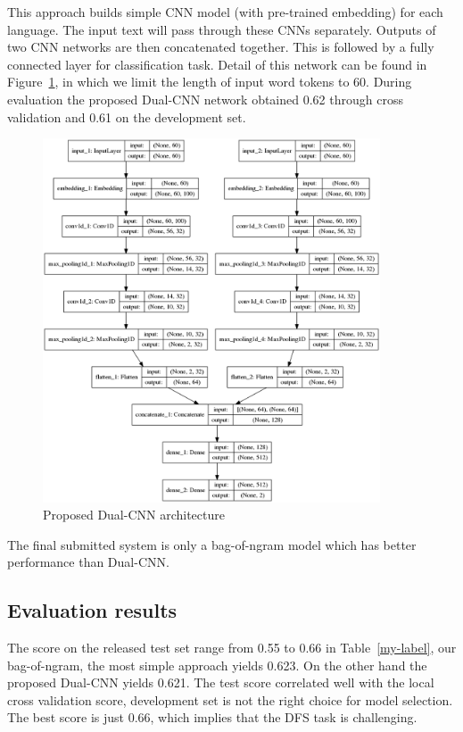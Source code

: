 \documentclass[11pt]{article}
\begin{document}
This approach builds simple CNN model (with pre-trained embedding) for each language. The input text will pass through these CNNs separately. Outputs of two CNN networks are then concatenated together. This is followed by a fully connected layer for classification task. Detail of this network can be found in Figure~\ref{fig:dualcnn}, in which we limit the length of input word tokens to 60. During evaluation the proposed Dual-CNN network obtained 0.62 through cross validation and 0.61 on the development set.
\begin{figure}[h]
	\centering
	\includegraphics[width=10cm]{../../images/getDUALCNN.png}
	\caption{Proposed Dual-CNN architecture} 
	
	\label{fig:dualcnn} 
\end{figure} 
The final submitted system is only a bag-of-ngram model which has better performance than Dual-CNN.




\subsection{Evaluation results}

The score on the released test set range from 0.55 to 0.66 in Table~\ref{my-label}, our bag-of-ngram, the most simple approach yields 0.623. On the other hand the proposed Dual-CNN yields 0.621. The test score correlated well with the local cross validation score, development set is not the right choice for model selection. The best score is just 0.66, which implies that the DFS task is challenging.
\end{document}
